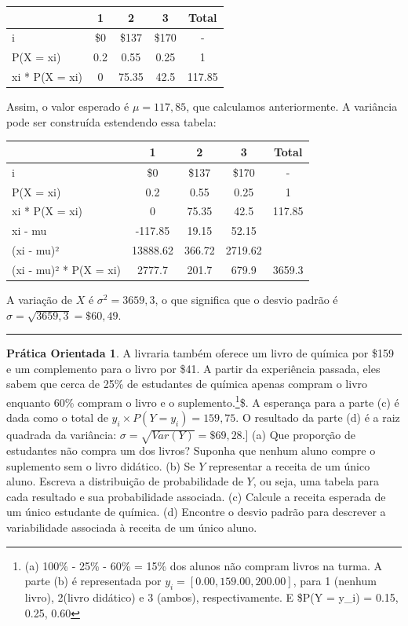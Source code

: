 \documentclass[
]{book}
\theoremstyle{definition}
\theoremstyle{definition}
\theoremstyle{definition}
\newtheorem{exercise}{Prática Orientada}[chapter]
\theoremstyle{definition}
\theoremstyle{remark}
\begin{document}
\begin{tabular}{l|c|c|c|c}
\hline
  & 1 & 2 & 3 & Total\\
\hline
i & \$0 & \$137 & \$170 & -\\
\hline
P(X = xi) & 0.2 & 0.55 & 0.25 & 1\\
\hline
xi * P(X = xi) & 0 & 75.35 & 42.5 & 117.85\\
\hline
\end{tabular}

Assim, o valor esperado é \(\mu = 117,85\), que calculamos anteriormente. A variância pode ser construída estendendo essa tabela:

\begin{tabular}{l|c|c|c|c}
\hline
  & 1 & 2 & 3 & Total\\
\hline
i & \$0 & \$137 & \$170 & -\\
\hline
P(X = xi) & 0.2 & 0.55 & 0.25 & 1\\
\hline
xi * P(X = xi) & 0 & 75.35 & 42.5 & 117.85\\
\hline
xi - mu & -117.85 & 19.15 & 52.15 & \\
\hline
(xi - mu)² & 13888.62 & 366.72 & 2719.62 & \\
\hline
(xi - mu)² * P(X = xi) & 2777.7 & 201.7 & 679.9 & 3659.3\\
\hline
\end{tabular}

A variação de \(X\) é \(\sigma^2 = 3659,3\), o que significa que o desvio padrão é \(\sigma = \sqrt{3659,3} = \$60,49\).

\begin{center}\rule{0.5\linewidth}{0.5pt}\end{center}

\begin{exercise}
\protect\hypertarget{exr:unnamed-chunk-75}{}{\label{exr:unnamed-chunk-75} }A livraria também oferece um livro de química por \$159 e um complemento para o livro por \$41. A partir da experiência passada, eles sabem que cerca de 25\% de estudantes de química apenas compram o livro enquanto 60\% compram o livro e o suplemento.\footnote{(a) 100\% - 25\% - 60\% = 15\% dos alunos não compram livros na turma. A parte (b) é representada por \(y_i = [0.00, 159.00, 200.00]\), para 1 (nenhum livro), 2(livro didático) e 3 (ambos), respectivamente. E \$P(Y = y\_i) = 0.15, 0.25, 0.60}\$. A esperança para a parte (c) é dada como o total de \(y_i\times P(Y=y_i) = 159,75\). O resultado da parte (d) é a raiz quadrada da variância: \(\sigma = \sqrt{Var(Y)} = \$69,28\).{]}
(a) Que proporção de estudantes não compra um dos livros? Suponha que nenhum aluno compre o suplemento sem o livro didático.
(b) Se \(Y\) representar a receita de um único aluno. Escreva a distribuição de probabilidade de \(Y\), ou seja, uma tabela para cada resultado e sua probabilidade associada.
(c) Calcule a receita esperada de um único estudante de química.
(d) Encontre o desvio padrão para descrever a variabilidade associada à receita de um único aluno.
\end{exercise}
\end{document}

